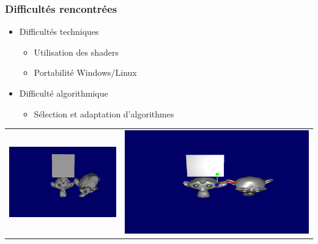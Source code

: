 \documentclass{beamer}
\begin{document}
\begin{frame}
\frametitle{Difficultés rencontrées}
\begin{itemize}[label=$\bullet$]
\item Difficultés techniques
\begin{itemize}[label=$\circ$]
\item Utilisation des shaders
\item Portabilité Windows/Linux
\end{itemize}
\item Difficulté algorithmique %
\begin{itemize}[label=$\circ$]
\item Sélection et adaptation d'algorithmes
\end{itemize}
\end{itemize}
\begin{tabular}{l|r}
\includegraphics[scale=0.315]{rendu_sans_shader.png}
&
\includegraphics[scale=0.20]{singe_shaders.png}
\end{tabular}

\end{frame}
\end{document}
